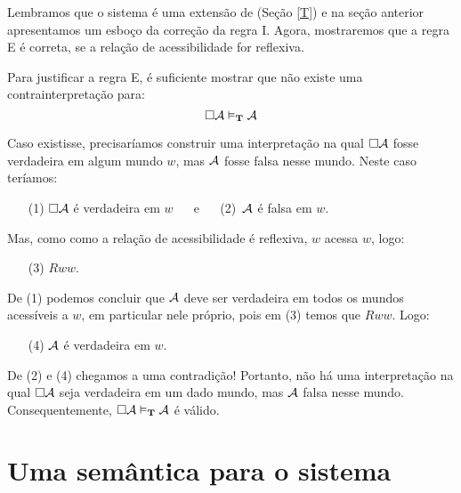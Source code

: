 Lembramos que o sistema \mlT{} é uma extensão de \mlK{} (Seção \ref{T})  e na seção anterior apresentamos um esboço da correção da  regra \ebox I.  Agora, mostraremos  que a regra  \ebox E é correta, se a relação de acessibilidade for reflexiva.  

Para justificar a regra \ebox E, é suficiente mostrar que não existe uma  contrainterpretação para:
\[
	\Box \mathcal{A}\vDash_{\mathbf{T}} \mathcal{A}
\]
 
 Caso existisse,  precisaríamos construir  uma interpretação  na qual $\Box \mathcal{A}$ fosse verdadeira em algum  mundo  $w$, mas $\mathcal{A}$ fosse falsa nesse mundo.  Neste caso teríamos:

  \begin{itemize}
	\item[(1)]  $\Box \mathcal{A}$ é verdadeira em $w$   \,\,\,\,\,\,  e \,\,\,\,\,\,  (2)\, $\mathcal{A}$  é falsa em $w$.   
\end{itemize}
Mas, como como a relação de acessibilidade é reflexiva, $w$ acessa $w$, logo: 
\begin{itemize}
	\item[(3)]  $Rww$.
\end{itemize}
De (1) podemos concluir que $\mathcal{A}$ deve ser verdadeira em todos os mundos acessíveis a $w$, em particular nele próprio,  pois em (3) temos que $Rww$. Logo:
\begin{itemize}
	\item[(4)]   $\mathcal{A}$ é verdadeira em $w$.
\end{itemize}
De (2) e  (4) chegamos a uma contradição!  Portanto, não há uma interpretação  na qual $\Box\mathcal{A}$ seja verdadeira em um dado mundo, mas  $\mathcal{A}$  falsa nesse mundo. Consequentemente,   $\Box \mathcal{A}\vDash_{\mathbf{T}} \mathcal{A}$ é válido.



\section{Uma semântica para o sistema \mlSfour}
\label{SemanticsS4}

